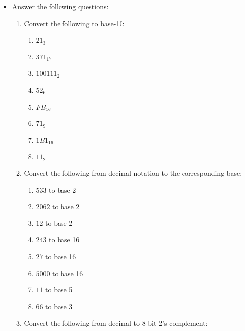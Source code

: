 \documentclass[10pt]{article}
\begin{document}
\begin{itemize}

\setlength\itemsep{10mm}


\item Answer the following questions:



  \begin{enumerate}
\setlength\itemsep{5mm}
\item Convert the following to base-10:
\begin{enumerate}[label=\Alph*]

\item $21_3$

\item $371_{17}$

\item $100111_2$

\item $52_6$

\item $FB_{16}$

\item $71_9$

\item $1B1_{16}$

\item $11_2$

\end{enumerate}

\item Convert the following from decimal notation to the corresponding base:
\begin{enumerate}[label=\Alph*]


\item $533$ to base 2

\item $2062$ to base 2

\item $12$ to base 2

\item $243$ to base 16

\item $27$ to base 16

\item $5000$ to base 16

\item $11$ to base 5

\item $66$ to base 3
\end{enumerate}

\item Convert the following from decimal to 8-bit 2's complement:
\begin{enumerate}[label=\Alph*]



\end{enumerate}
\end{enumerate}
\end{itemize}
\end{document}
